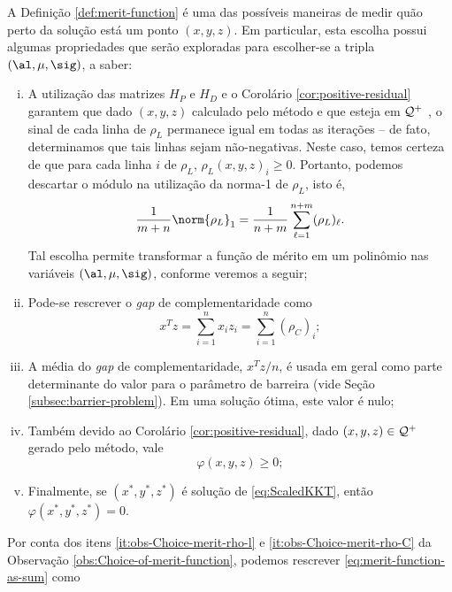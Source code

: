 \begin{obs}
\label{obs:Choice-of-merit-function}
A Definição \ref{def:merit-function} é uma das possíveis maneiras de medir quão
perto da solução está um ponto $(x,y,z)$. Em particular,  esta escolha possui algumas
propriedades que serão exploradas para escolher-se a tripla $(\al,\mu,\sig)$, a
saber:

\begin{enumerate}[(i)] 

	

\item \label{it:obs-Choice-merit-rho-l} A utilização das matrizes $H_P$ e $H_D$  e o Corolário
\ref{cor:positive-residual} garantem que dado $(x,y,z)$ calculado pelo
método e que esteja em $\mathcal{Q}^+$ ,  o sinal de cada linha de $\rho_{L}$ permanece igual em todas as iterações --  de fato, determinamos que tais linhas sejam não-negativas. Neste caso, temos certeza de que para cada linha $i$ de $\rho_{L}$,  $\rho_L(x,y,z)_{i}\geq 0$. Portanto, podemos descartar o módulo na utilização da norma-1 de $\rho_{L}$, isto é,
\[\frac{1}{m+n}\norm{\rho_L}_1 = \frac{1}{n+m}\sum_{\ell=1}^{n+m}(\rho_L)_\ell. \] 
Tal escolha permite transformar a função de mérito em um polinômio nas variáveis $(\al,\mu,\sig)$, conforme veremos a seguir; 



\item \label{it:obs-Choice-merit-rho-C} Pode-se rescrever o
\emph{gap} de complementaridade como
 \[x^Tz = \sum_{i=1}^{n}x_iz_i = \sum_{i=1}^{n}(\rho_C)_i;\]

\item A média do \emph{gap} de complementaridade, $x^Tz/n$, é usada em geral
como parte determinante do valor para o parâmetro de barreira (vide Seção
\ref{subsec:barrier-problem}). Em uma solução ótima, este valor é
nulo;    
\item Também devido ao Corolário \ref{cor:positive-residual}, dado
$(x,y,z)\in\mathcal{Q}^+$ gerado pelo método, vale
\[
\varphi(x,y,z)\geq0;
\]
	\item Finalmente, se $(x^*,y^*,z^*)$ é solução de
\eqref{eq:ScaledKKT}, então $\varphi(x^*,y^*,z^*)=0$.
\end{enumerate}
\end{obs}


Por conta dos itens \eqref{it:obs-Choice-merit-rho-l} e \eqref{it:obs-Choice-merit-rho-C} da Observação \ref{obs:Choice-of-merit-function}, podemos rescrever
\eqref{eq:merit-function-as-sum} como


